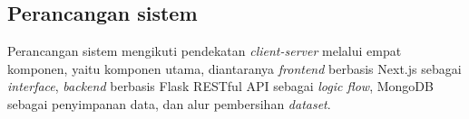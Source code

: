 
\subsection{Perancangan sistem}
Perancangan sistem mengikuti pendekatan \textit{client-server} melalui empat komponen, yaitu komponen utama, diantaranya \textit{frontend} berbasis Next.js sebagai \textit{interface}, \textit{backend} berbasis Flask RESTful API sebagai \textit{logic flow}, MongoDB sebagai penyimpanan data, dan alur pembersihan \textit{dataset}.

